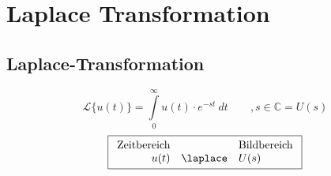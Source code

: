 



\chapter{Laplace Transformation}

\section{Laplace-Transformation}
\[ \boxed{\mathcal{L} \lbrace u(t) \rbrace 
= \int\limits_{0}^{\infty} u(t) \cdot e^{-st} ~ dt \qquad , s \in \mathbb{C} 
= U(s)} \]
\[ \boxed{\begin{array}{rcl}
\text{Zeitbereich} &  & \text{Bildbereich} \\
u(t) & \laplace & U(s)
\end{array}} \]


